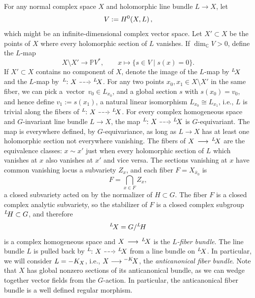 \documentclass[11pt]{article}
\numberwithin{equation}{section}
\providecommand{\C}{\mathbb{C}}
\numberwithin{equation}{section}
\renewcommand{\C}{\mathbb{C}}
\newcommand*{\dimC}[1]{\ensuremath{\dim_{\C} \! #1}}
\newcommand*{\acf}[1]{\Iitaka[\acb{}]{#1}}
\begin{document}
For any normal complex space $X$ and holomorphic line bundle $L \to X$, let
\[
V := \cohomology{0}{X, L},
\]
which might be an infinite-dimensional complex vector space.
Let $X' \subset X$ be the points of $X$ where every holomorphic section of $L$ vanishes.
If $\dimC{ V} > 0$, define the $L$-map
\[
X\setminus X' \longrightarrow \mathbb{P}V^*, \qquad x \longmapsto \{s \in V\mid s(x)=0\}.
\]
If $X' \subset X$ contains no component of $X$, denote the image of the $L$-map by $\Iitaka[L]{X}$ and the $L$-map
by~$\rationalMap[\Iitaka[L]{}]{X}{\Iitaka[L]{X}}$.
For any two points $x_0, x_1 \in X\setminus X'$ in the same fiber, we can pick a~vector~${v_0 \in L_{x_0}}$, and a global
section $s$ with $s(x_0) = v_0$, and hence define $v_1 := s(x_1)$, a natural linear isomorphism $L_{x_0}
 \cong L_{x_1}$, i.e., $L$ is trivial along the fibers of $\rationalMap[\Iitaka[L]{}]{X}{\Iitaka[L]{X}}$.
For every complex homogeneous space  and $G$-invariant line bundle $L \to X$, the map $\rationalMap[\Iitaka[L]{}]{X}{\Iitaka[L]{X}}$ is $G$-equivariant.
The map is everywhere defined, by $G$-equivariance, as long as $L\to X$ has at least one holomorphic section not everywhere vanishing.
The fibers of $X \to \Iitaka[L]{X}$ are the equivalence classes: $x \sim x'$ just when every holomorphic section of $L$ which vanishes at $x$ also vanishes at $x'$ and vice versa.
The sections vanishing at $x$ have common vanishing locus a subvariety $Z_x$, and each fiber $F = X_{\overline{x}_0}$ is
\[
F = \bigcap_{x \in F} Z_x,
\]
a closed subvariety acted on by the normalizer of $H \subset G$.
The fiber $F$ is a closed complex analytic subvariety, so the stabilizer of $F$ is a closed complex subgroup $\Iitaka[L]{H}
 \subset G$, and therefore
 \[\Iitaka[L]{X} = G/\Iitaka[L]{H}\]
 is a complex homogeneous space and $X \to \Iitaka[L]{X}$ is the \emph{$L$-fiber bundle}.
The line bundle $L$ is pulled back by $\rationalMap[\Iitaka[L]{}]{X}{\Iitaka[L]{X}}$ from a line bundle on $\Iitaka[L]{X}$.
In particular, we will consider $L = \acb{X}$, i.e., $X \longrightarrow \acf{X}$, the \emph{anticanonical fiber bundle}.
Note that $X$ has global nonzero sections of its anticanonical bundle, as we can wedge together vector fields from the $G$-action.
In particular, the anticanonical fiber bundle is a well defined regular morphism.
\end{document}
